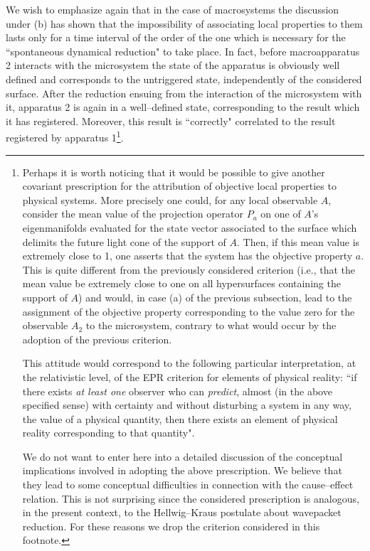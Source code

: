 \documentclass[12pt]{article}
\begin{document}
We wish to emphasize again that in the case of macrosystems the
discussion under (b) has shown that the impossibility of
associating local properties to them lasts only for a time
interval of the order of the one which is necessary for the
``spontaneous dynamical reduction" to take place. In fact, before
macroapparatus 2 interacts with the microsystem the state of the
apparatus is obviously well defined and corresponds to the
untriggered state, independently of the considered surface. After
the reduction ensuing from the interaction of the microsystem with
it, apparatus 2 is again in a well--defined state, corresponding
to the result which it has registered. Moreover, this result is
``correctly" correlated to the result registered by apparatus
1\footnote{Perhaps it is worth noticing that it would be possible
to give another covariant prescription for the attribution of
objective local properties to physical systems. More precisely one
could, for any local observable $A$, consider the mean value of
the projection operator $P_{a}$ on one of $A$'s eigenmanifolds
evaluated for the state vector associated to the surface which
delimits the future light cone of the support of $A$. Then, if
this mean value is extremely close to 1, one asserts that the
system has the objective property $a$. This is quite different
from the previously considered criterion (i.e., that the mean
value be extremely close to one on all hypersurfaces containing
the support of $A$) and would, in case (a) of the previous
subsection, lead to the assignment of the objective property
corresponding to the value zero for the observable $A_{2}$ to the
microsystem, contrary to what would occur by the adoption of the
previous criterion.

This attitude would correspond to the following particular
interpretation, at the relativistic level, of the EPR criterion
for elements of physical reality: ``if there exists {\it at least
one} observer who can {\it predict}, almost (in the above
specified sense) with certainty and without disturbing a system in
any way, the value of a physical quantity, then there exists an
element of physical reality corresponding to that quantity".

We do not want to enter here into a detailed discussion of the
conceptual implications involved in adopting the above
prescription. We believe that they lead to some conceptual
difficulties in connection with the cause--effect relation. This
is not surprising since the considered prescription is analogous,
in the present context, to the Hellwig--Kraus \cite{hkd} postulate
about wavepacket reduction. For these reasons we drop the
criterion considered in this footnote.}.
\end{document}
